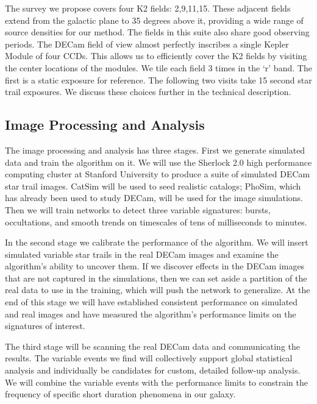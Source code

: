 \documentclass[11pt]{article}
\begin{document}
The survey we propose covers four K2 fields: 2,9,11,15. These adjacent fields extend from the galactic plane to 35 degrees above it, providing a wide range of source densities for our method. The fields in this suite also share good observing periods. The DECam field of view almost perfectly inscribes a single Kepler Module of four CCDs. This allows us to efficiently cover the K2 fields by visiting the center locations of the modules. We tile each field 3 times in the `r' band. The first is a static exposure for reference. The following two visits take 15 second star trail exposures. We discuss these choices further in the technical description. 

\subsection*{Image Processing and Analysis}

The image processing and analysis has three stages. First we generate simulated data and train the algorithm on it. We will use the Sherlock 2.0 high performance computing cluster at Stanford University to produce a suite of simulated DECam star trail images. CatSim will be used to seed realistic catalogs; PhoSim, which has already been used to study DECam, will be used for the image simulations. Then we will train networks to detect three variable signatures: bursts, occultations, and smooth trends on timescales of tens of milliseconds to minutes.

In the second stage we calibrate the performance of the algorithm. We will insert simulated variable star trails in the real DECam images and examine the algorithm's ability to uncover them. If we discover effects in the DECam images that are not captured in the simulations, then we can set aside a partition of the real data to use in the training, which will push the network to generalize. At the end of this stage we will have established consistent performance on simulated and real images and have measured the algorithm's performance limits on the signatures of interest.

The third stage will be scanning the real DECam data and communicating the results. The variable events we find will collectively support global statistical analysis and individually be candidates for custom, detailed follow-up analysis. We will combine the variable events with the performance limits to constrain the frequency of specific short duration phenomena in our galaxy. 

% 
\end{document}
